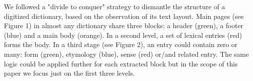\documentclass[twocolumn,a4paper]{article}
\begin{document}
 We followed a "divide to conquer" strategy to dismantle the structure of a digitized dictionary, based on the observation of its text layout. Main pages (see Figure 1) in almost any  dictionary share three blocks: a header (green), a footer (blue) and a main body (orange). In a second level, a set of lexical entries (red) forms the body. In a third stage (see Figure 2), an entry could contain zero or many: form (green), etymology (blue), sense (red) or/and related entry. The same logic could be applied further for each extracted block but in the scope of this paper we focus just on the first three levels.  
 \begin{figure}
\end{figure}
\begin{figure}
\end{figure}  
 
\end{document}
